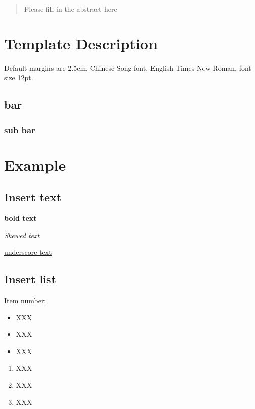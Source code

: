 \documentclass[12pt,hyperref,a4paper,UTF8]{ctexart}
\begin{document}
\cover
\thispagestyle{empty}%
\newpage
\begin{abstract}
    Please fill in the abstract here
\end{abstract}


\newpage
\tableofcontents

\newpage

\section{Template Description}
Default margins are 2.5cm, Chinese Song font, English Times New Roman, font size 12pt.
\subsection{bar}
\subsubsection{sub bar}
\section{Example}

\subsection{Insert text}
\textbf{bold text}

\textit{Skewed text}

\underline{underscore text}

\subsection{Insert list}
Item number:

\begin{itemize}
    \item XXX
    \item XXX
    \item XXX
\end{itemize}

\begin{enumerate}
    \item XXX
    \item XXX
    \item XXX
\end{enumerate}
\end{document}
